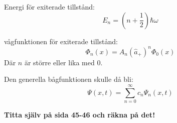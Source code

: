 \documentclass{article}
\begin{document}
Energi för exiterade tillstånd:
\begin{equation}
  E_n=(n+\frac{1}{2})\hbar \omega
\end{equation}

vågfunktionen för exiterade tillstånd:
\begin{equation}
  \Phi_n(x)=A_n(\hat{a}_+)^n\Phi_0(x)
\end{equation}
Där $n$ är större eller lika med $0$.

Den generella bågfunktionen skulle då bli:
\begin{equation}
  \Psi(x,t)=\sum_{n=0}^{\infty}c_n\Psi_n(x,t)
\end{equation}

\textbf{Titta själv på sida 45-46 och räkna på det!}
\end{document}
